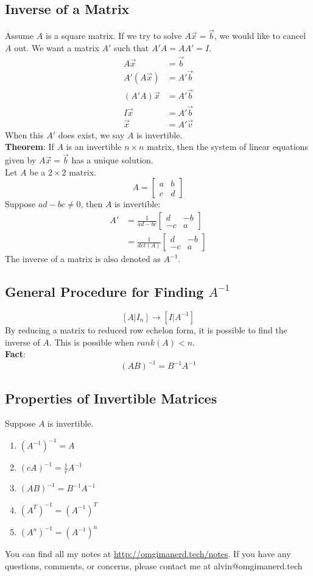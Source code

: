 \documentclass[letterpaper, 12pt]{math}
\begin{document}
\subsection*{Inverse of a Matrix}
Assume \( A \) is a square matrix. If we try to solve \( A\vec{x} = \vec{b} \),
we would like to cancel \( A \) out. We want a matrix \( A' \) such that
\( A'A = AA' = I \).
\begin{align*}
  A\vec{x} &= \vec{b} \\
  A'(A\vec{x}) &= A'\vec{b} \\
  (A'A)\vec{x} &= A'\vec{b} \\
  I\vec{x} &= A'\vec{b} \\
  \vec{x} &= A'\vec{v}
\end{align*}
When this \( A' \) does exist, we say \( A \) is invertible. \\
\textbf{Theorem}: If \( A \) is an invertible \( n\times n \) matrix, then the
system of linear equations given by \( A\vec{x} = \vec{b} \) has a unique
solution. \\
Let \( A \) be a \( 2\times2 \) matrix.
\[ A = \begin{bmatrix}a & b \\ c & d\end{bmatrix} \]
Suppose \( ad-bc \ne 0 \), then \( A \) is invertible:
\begin{align*}
  A' &= \frac{1}{ad-bc}\begin{bmatrix}d & -b \\ -c & a\end{bmatrix} \\
  &= \frac{1}{det(A)}\begin{bmatrix}d & -b \\ -c & a\end{bmatrix}
\end{align*}
The inverse of a matrix is also denoted as \( A^{-1} \).

\subsection*{General Procedure for Finding \( A^{-1} \)}
\[ [A|I_n] \rightarrow [I|A^{-1}] \]
By reducing a matrix to reduced row echelon form, it is possible to find the
inverse of \( A \). This is possible when \( rank(A) < n \). \\
\textbf{Fact}:
\[ (AB)^{-1} = B^{-1}A^{-1} \]

\subsection*{Properties of Invertible Matrices}
Suppose \( A \) is invertible.
\begin{enumerate}
  \item \( (A^{-1})^{-1} = A \)
  \item \( (cA)^{-1} = \frac{1}{c}A^{-1} \)
  \item \( (AB)^{-1} = B^{-1}A^{-1} \)
  \item \( (A^T)^{-1} = (A^{-1})^T \)
  \item \( (A^n)^{-1} = (A^{-1})^n \)
\end{enumerate}

\begin{center}
  You can find all my notes at \url{http://omgimanerd.tech/notes}. If you have
  any questions, comments, or concerns, please contact me at
  alvin@omgimanerd.tech
\end{center}
\end{document}
